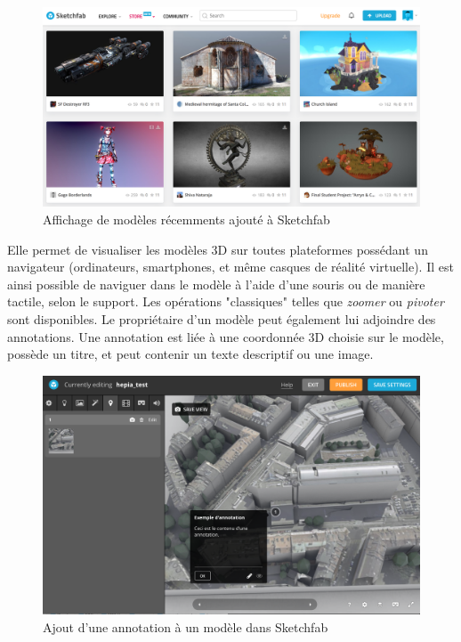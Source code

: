 \begin{figure}
    \centering
    \includegraphics[width=\linewidth]{Figures/sketchfab-overview.png}
    \caption{Affichage de modèles récemments ajouté à Sketchfab}
    \label{fig:sketchfab-overview}
\end{figure}

Elle permet de visualiser les modèles 3D sur toutes plateformes possédant un navigateur (ordinateurs, smartphones, et même casques de réalité virtuelle).
Il est ainsi possible de naviguer dans le modèle à l'aide d'une souris ou de manière tactile, selon le support. Les opérations "classiques" telles que \textit{zoomer} ou \textit{pivoter} sont disponibles.
Le propriétaire d'un modèle peut également lui adjoindre des annotations. Une annotation est liée à une coordonnée 3D choisie sur le modèle, possède un titre, et peut contenir un texte descriptif ou une image.

\begin{figure}[ht]
    \centering
    \includegraphics[width=\linewidth]{Figures/sketchfab-annotation-example.png}
    \caption{Ajout d'une annotation à un modèle dans Sketchfab}
    \label{fig:sketchfab-annotation-example}
\end{figure}

